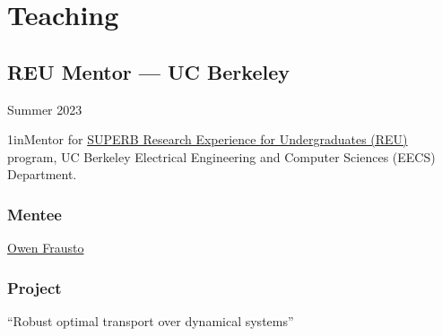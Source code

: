 \documentclass[11pt]{article}
\newcommand{\sectionwidth}{1in}		%
\newcommand{\subsectionskip}{\baselineskip}	%
\newcommand{\cvdate}[1]{\hfill#1}			%
\begin{document}
	\section{Teaching}

	\subsection{REU Mentor --- UC Berkeley}
	\cvdate{Summer 2023}
	
	\begin{adjustwidth}{\sectionwidth}{}Mentor for \href{https://eecs.berkeley.edu/resources/undergrads/research/superb}{SUPERB Research Experience for Undergraduates (REU)} program, UC Berkeley Electrical Engineering and Computer Sciences (EECS) Department.\end{adjustwidth}

	\subsubsection{Mentee}
	\href{https://www.linkedin.com/in/owen-frausto-39786a217}{Owen Frausto}
	
	\subsubsection{Project}
	``Robust optimal transport over dynamical systems''
	
	\vspace*{\subsectionskip}
	
\end{document}
